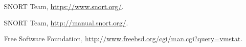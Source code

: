 \documentclass[10pt,a4paper]{article}
\begin{document}
    \newpage
    \begin{thebibliography}{9}

      SNORT Team,
      \url{https://www.snort.org/}.

      SNORT Team,
      \url{http://manual.snort.org/}.

      Free Software Foundation,
      \url{http://www.freebsd.org/cgi/man.cgi?query=vmstat}.
    \end{thebibliography}
\end{document}

